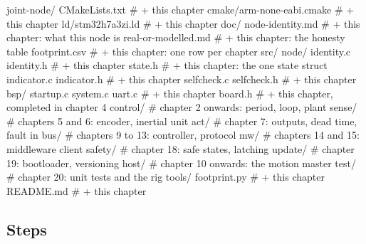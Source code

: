 \begin{plaincode}
joint-node/
  CMakeLists.txt                      # + this chapter
  cmake/arm-none-eabi.cmake           # + this chapter
  ld/stm32h7a3zi.ld                   # + this chapter
  doc/
    node-identity.md                  # + this chapter: what this node is
    real-or-modelled.md               # + this chapter: the honesty table
    footprint.csv                     # + this chapter: one row per chapter
  src/
    node/
      identity.c  identity.h          # + this chapter
      state.h                         # + this chapter: the one state struct
      indicator.c indicator.h         # + this chapter
      selfcheck.c selfcheck.h         # + this chapter
    bsp/
      startup.c  system.c  uart.c     # + this chapter
      board.h                         # + this chapter, completed in chapter 4
    control/                          # chapter 2 onwards: period, loop, plant
    sense/                            # chapters 5 and 6: encoder, inertial unit
    act/                              # chapter 7: outputs, dead time, fault in
    bus/                              # chapters 9 to 13: controller, protocol
    mw/                               # chapters 14 and 15: middleware client
    safety/                           # chapter 18: safe states, latching
    update/                           # chapter 19: bootloader, versioning
  host/                               # chapter 10 onwards: the motion master
  test/                               # chapter 20: unit tests and the rig
  tools/
    footprint.py                      # + this chapter
  README.md                           # + this chapter
\end{plaincode}

\subsection*{Steps}

